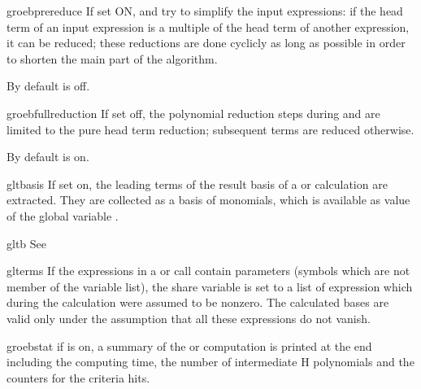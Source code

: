 
\begin{Switch}{groebprereduce}
If  set ON,  
and  try to simplify the
input expressions: if the head term of an input expression is a
multiple of the head term of another expression, it can be reduced;
these reductions are done cyclicly as long as possible in order to
shorten the main part of the algorithm.

By default  is off.
\end{Switch}


\begin{Switch}{groebfullreduction}
If  set off, the polynomial reduction steps during
 and  are limited to the pure head
term reduction; subsequent terms are reduced otherwise.

By default  is on.
\end{Switch}


\begin{Switch}{gltbasis}
If  set on, the leading terms of the result basis 
of a  or  calculation are
extracted. They are collected as a basis of monomials, which is
available as value of the global variable .
\end{Switch}
\begin{Variable}{gltb}
See 
\end{Variable}

\begin{Variable}{glterms}
If the expressions in a  or  
call contain parameters (symbols
which are not member of the variable list), the share variable
 is set to a list of expression which during the
calculation were assumed to be nonzero. The calculated bases 
are valid only under the assumption that all these expressions do
not vanish.
\end{Variable}

\begin{Switch}{groebstat}
if  is on, a summary of the 
 or  computation is printed
at the end 
including the computing time, the number of intermediate
H polynomials and the counters for the criteria hits.
\end{Switch}

